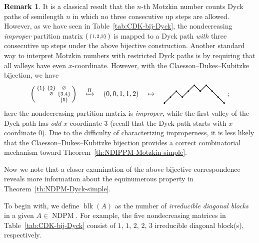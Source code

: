 \documentclass[12pt,reqno]{amsart}
\numberwithin{equation}{section}
\theoremstyle{theorem}
\theoremstyle{definition}
\newtheorem{remark}[theorem]{Remark}
\theoremstyle{named}
\newcommand{\OEIS}[1]{\href{https://oeis.org/#1}{#1}}
\newcommand{\NDPM}{\operatorname{NDPM}}
\newcommand{\blk}{\operatorname{blk}}
\begin{document}
\begin{remark}\label{rmk:CDK-NDIPPM}
	It is a classical result \cite[p.~296, Item~(M6)]{DS1977} that the $n$-th Motzkin number counts Dyck paths of semilength $n$ in which no three consecutive up steps are allowed. However, as we have seen in Table~\ref{tab:CDK-bij-Dyck}, the nondecreasing \emph{improper} partition matrix $\begin{psmallmatrix}
		\{1,2,3\}
	\end{psmallmatrix}$ is mapped to a Dyck path \emph{with} three consecutive up steps under the above bijective construction. Another standard way \cite[\OEIS{A001006}]{OEIS} to interpret Motzkin numbers with restricted Dyck paths is by requiring that all valleys have even $x$-coordinate. However, with the Claesson--Dukes--Kubitzke bijection, we have
	\begin{align*}
		\begin{psmallmatrix}
			\{1\} & \{2\} & \varnothing\\
			& \varnothing & \{3,4\}\\
			& & \{5\}
		\end{psmallmatrix} \quad\xmapsto{\Pi}\quad
		(0,0,1,1,2)
		\quad\mapsto\quad \vcenter{\hbox{\begin{tikzpicture}[line width=0.8pt,scale=0.3]
					\coordinate (O) at (0,0);
					\draw[thick] (O)--++(1,1)--++(1,1)--++(1,-1)--++(1,1)--++(1,1)--++(1,-1)--++(1,1)--++(1,-1)--++(1,-1)--++(1,-1);
					\filldraw (O) circle(0.5ex) ++(1,1)circle(0.5ex) ++(1,1)circle(0.5ex) ++(1,-1)circle(0.5ex)
					++(1,1)circle(0.5ex) ++(1,1)circle(0.5ex) ++(1,-1)circle(0.5ex) ++(1,1)circle(0.5ex) ++(1,-1)circle(0.5ex) ++(1,-1)circle(0.5ex) ++(1,-1)circle(0.5ex);
		\end{tikzpicture}}}\,\,;
	\end{align*}
	here the nondecreasing partition matrix is \emph{improper}, while the first valley of the Dyck path has \emph{odd} $x$-coordinate $3$ (recall that the Dyck path starts with $x$-coordinate $0$). Due to the difficulty of characterizing improperness, it is less likely that the Claesson--Dukes--Kubitzke bijection provides a correct combinatorial mechanism toward Theorem~\ref{th:NDIPPM-Motzkin-simple}.
\end{remark}

Now we note that a closer examination of the above bijective correspondence reveals more information about the equinumerous property in Theorem~\ref{th:NDPM-Dyck-simple}.

To begin with, we define $\blk(A)$ as the number of \emph{irreducible diagonal blocks} in a given $A\in \NDPM$. For example, the five nondecreasing matrices in Table~\ref{tab:CDK-bij-Dyck} consist of $1$, $1$, $2$, $2$, $3$ irreducible diagonal block(s), respectively.
\end{document}
